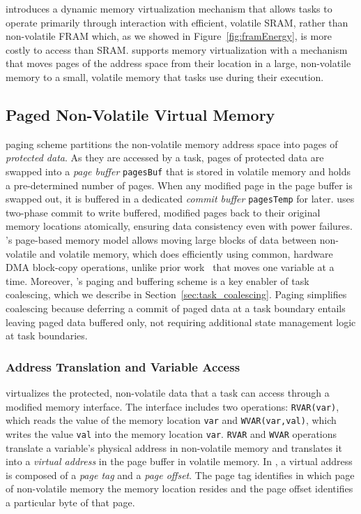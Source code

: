 \sys introduces a dynamic memory virtualization mechanism that allows tasks to operate primarily through interaction with efficient, volatile SRAM, rather than non-volatile FRAM which, as we showed in Figure~\ref{fig:framEnergy}, is more costly to access than SRAM. \sys supports memory virtualization with a mechanism that moves pages of the address space from their location in a large, non-volatile memory to a small, volatile memory that tasks use during their execution.

\subsection{Paged Non-Volatile Virtual Memory} 

\sys paging scheme partitions the non-volatile memory address space into pages of {\em protected data}. As they are accessed by a task, pages of protected data are swapped into a {\em page buffer} \texttt{pagesBuf} that is stored in volatile memory and holds a pre-determined number of pages. When any modified page in the page buffer is swapped out, it is buffered in a dedicated {\em commit buffer} \texttt{pagesTemp} for later. \sys uses two-phase commit to write buffered, modified pages back to their original memory locations atomically, ensuring data consistency even with power failures. \sys's page-based memory model allows moving large blocks of data between non-volatile and volatile memory, which \sys does efficiently using common,
hardware DMA block-copy operations, unlike prior work~\cite{chain,alpaca} that moves one variable at a time. Moreover, \sys's paging and buffering scheme is a key enabler of task coalescing, which we describe in Section~\ref{sec:task_coalescing}. Paging simplifies coalescing because deferring a commit of paged data at a task boundary entails leaving paged data buffered only, not requiring additional state management logic at task boundaries.

\subsubsection{Address Translation and Variable Access}

\sys virtualizes the protected, non-volatile data that a task can access through a modified memory interface. The interface includes two operations: \texttt{RVAR(var)}, which reads the value of the memory location {\tt var} and \texttt{WVAR(var,val)}, which writes the value {\tt val} into the memory location {\tt var}. {\tt RVAR} and {\tt WVAR} operations translate a variable's physical address in non-volatile memory and translates it into a \emph{virtual address} in the page buffer in volatile memory.  In \sys, a virtual address is composed of a \emph{page tag} and a \emph{page offset}. The page tag identifies in which page of non-volatile memory the memory location resides and the page offset identifies a particular byte of that page. 

